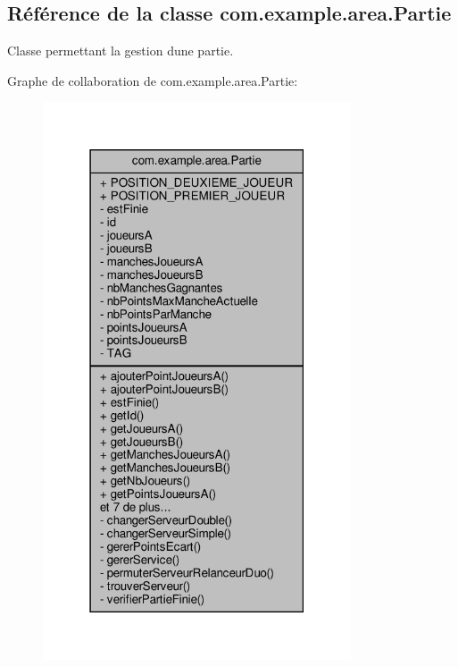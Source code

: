 \hypertarget{classcom_1_1example_1_1area_1_1_partie}{}\subsection{Référence de la classe com.\+example.\+area.\+Partie}
\label{classcom_1_1example_1_1area_1_1_partie}


Classe permettant la gestion d\textquotesingle{}une partie.  




Graphe de collaboration de com.\+example.\+area.\+Partie\+:
\nopagebreak
\begin{figure}[H]
\begin{center}
\leavevmode
\includegraphics[width=259pt]{classcom_1_1example_1_1area_1_1_partie__coll__graph}
\end{center}
\end{figure}
